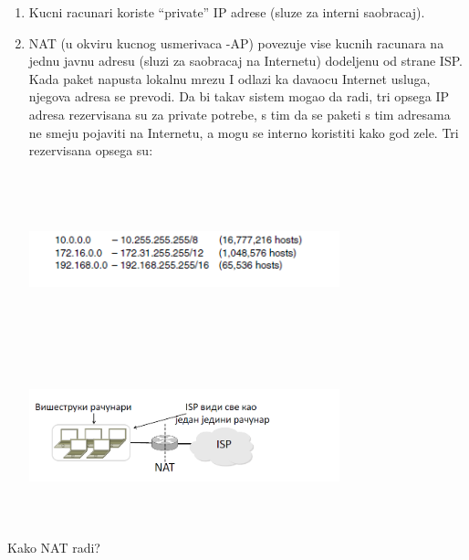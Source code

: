 \documentclass{article} %
\begin{document}
\begin{enumerate}
	\item Kucni racunari koriste “private” IP adrese (sluze za interni saobracaj).
	\item NAT (u okviru kucnog usmerivaca -AP) povezuje vise kucnih racunara na jednu javnu adresu (sluzi za saobracaj na 			Internetu) dodeljenu od strane ISP.
	Kada paket napusta lokalnu  mrezu I odlazi ka davaocu Internet usluga, njegova adresa se prevodi. Da bi takav sistem
	mogao da radi, tri opsega IP adresa rezervisana su za private potrebe, s tim da se paketi s tim adresama ne smeju
	pojaviti na Internetu, a mogu se interno koristiti kako god zele. Tri rezervisana opsega su:
	\begin{center}
		\includegraphics[width=9cm, height=5cm]{opseg}\\
		\includegraphics[width=9cm, height=5cm]{nat}\\
	\end{center}
\end{enumerate}
Kako NAT radi?
\end{document}
